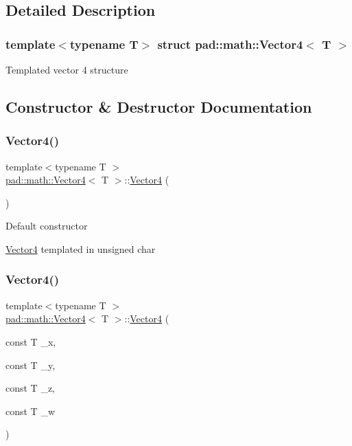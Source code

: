 \subsection{Detailed Description}
\subsubsection*{template$<$typename T$>$\newline
struct pad\+::math\+::\+Vector4$<$ T $>$}

Templated vector 4 structure 

\subsection{Constructor \& Destructor Documentation}
\mbox{\label{structpad_1_1math_1_1_vector4_a685f645bb73f9e7e2f0cfad10f8c9b3b}} 
\subsubsection{\texorpdfstring{Vector4()}{Vector4()}\hspace{0.1cm}{\footnotesize\ttfamily [1/5]}}
{\footnotesize\ttfamily template$<$typename T $>$ \\
\mbox{\hyperlink{structpad_1_1math_1_1_vector4}{pad\+::math\+::\+Vector4}}$<$ T $>$\+::\mbox{\hyperlink{structpad_1_1math_1_1_vector4}{Vector4}} (\begin{DoxyParamCaption}{ }\end{DoxyParamCaption})}

Default constructor

\mbox{\hyperlink{structpad_1_1math_1_1_vector4}{Vector4}} templated in unsigned char \mbox{\label{structpad_1_1math_1_1_vector4_a9ba6589a62f7635c2255c52c7b818aec}} 
\subsubsection{\texorpdfstring{Vector4()}{Vector4()}\hspace{0.1cm}{\footnotesize\ttfamily [2/5]}}
{\footnotesize\ttfamily template$<$typename T $>$ \\
\mbox{\hyperlink{structpad_1_1math_1_1_vector4}{pad\+::math\+::\+Vector4}}$<$ T $>$\+::\mbox{\hyperlink{structpad_1_1math_1_1_vector4}{Vector4}} (\begin{DoxyParamCaption}\item[{const T}]{\+\_\+x,  }\item[{const T}]{\+\_\+y,  }\item[{const T}]{\+\_\+z,  }\item[{const T}]{\+\_\+w }\end{DoxyParamCaption})}


